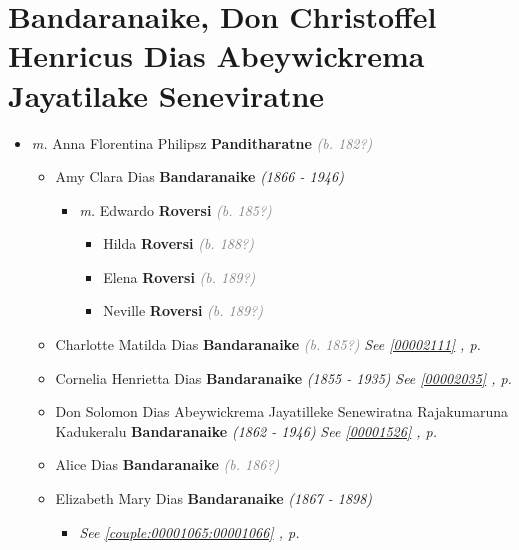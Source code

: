 \documentclass[10pt, openany]{book}
\begin{document}
\chapter{Bandaranaike, Don Christoffel Henricus Dias Abeywickrema Jayatilake Seneviratne}
\label{00002033}
\textcolor{slmaroon}{\textit{}}
\begin{itemize}
\item{\textit{m.} Anna Florentina Philipsz \textbf{Panditharatne} \textcolor{gray}{\textit{(b. 182?)}}   \label{couple:00002033:00002034} \begin{itemize}
\item{Amy Clara Dias \textbf{Bandaranaike} \textcolor{slorange}{\textit{(1866 - 1946)}}
\begin{itemize}
\item{\textit{m.} Edwardo \textbf{Roversi} \textcolor{gray}{\textit{(b. 185?)}}   \label{couple:00002106:00002107} \begin{itemize}
\item{Hilda \textbf{Roversi} \textcolor{gray}{\textit{(b. 188?)}}
 }
\item{Elena \textbf{Roversi} \textcolor{gray}{\textit{(b. 189?)}}
 }
\item{Neville \textbf{Roversi} \textcolor{gray}{\textit{(b. 189?)}}
 }
\end{itemize}}
\end{itemize}
   }
\item{Charlotte Matilda Dias \textbf{Bandaranaike} \textcolor{gray}{\textit{(b. 185?)}} \textcolor{slteal}{\textit{See  \autoref{00002111} \textit{, p. \pageref{00002111} }}}}
\item{Cornelia Henrietta Dias \textbf{Bandaranaike} \textcolor{slorange}{\textit{(1855 - 1935)}} \textcolor{slteal}{\textit{See  \autoref{00002035} \textit{, p. \pageref{00002035} }}}}
\item{Don Solomon Dias Abeywickrema Jayatilleke Senewiratna Rajakumaruna Kadukeralu \textbf{Bandaranaike} \textcolor{slorange}{\textit{(1862 - 1946)}} \textcolor{slteal}{\textit{See  \autoref{00001526} \textit{, p. \pageref{00001526} }}}}
\item{Alice Dias \textbf{Bandaranaike} \textcolor{gray}{\textit{(b. 186?)}}
  }
\item{Elizabeth Mary Dias \textbf{Bandaranaike} \textcolor{slorange}{\textit{(1867 - 1898)}}
\begin{itemize}
\item{\textcolor{slteal}{\textit{See  \autoref{couple:00001065:00001066} \textit{, p. \pageref{couple:00001065:00001066} }}}}
\end{itemize}
   }
\end{itemize}}
\end{itemize}
       
\end{document}
